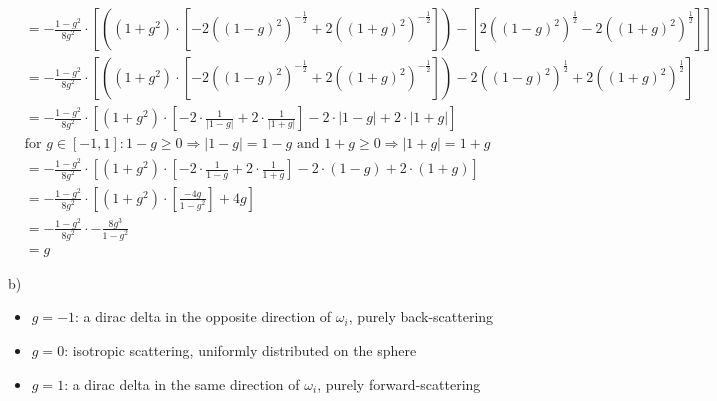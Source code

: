 \documentclass{article}
\begin{document}
{{\begin{align*}
        &= -\frac{1 - g^2}{8g^2} \cdot \left[\left( (1 + g^2) \cdot \left[-2((1-g)^2)^{-\frac{1}{2}} + 2((1+g)^2)^{-\frac{1}{2}}\right]\right) - \left[2((1-g)^2)^{\frac{1}{2}} - 2((1+g)^2)^{\frac{1}{2}}\right] \right]\\
        &= -\frac{1 - g^2}{8g^2} \cdot \left[\left( (1 + g^2) \cdot \left[-2((1-g)^2)^{-\frac{1}{2}} + 2((1+g)^2)^{-\frac{1}{2}}\right]\right) - 2((1-g)^2)^{\frac{1}{2}} + 2((1+g)^2)^{\frac{1}{2}} \right]\\
        &= -\frac{1 - g^2}{8g^2} \cdot \left[ (1 + g^2) \cdot \left[-2 \cdot \frac{1}{|1-g|} + 2 \cdot \frac{1}{|1+g|}\right] - 2 \cdot |1-g| + 2 \cdot |1+g|\right]\\
        &\text{for } g \in [-1,1]: 1-g \geq 0 \Rightarrow |1-g|=1-g \text{ and } 1+g \geq 0 \Rightarrow |1+g| = 1+g\\
        &= -\frac{1 - g^2}{8g^2} \cdot \left[ (1 + g^2) \cdot \left[-2 \cdot \frac{1}{1-g} + 2 \cdot \frac{1}{1+g}\right] - 2 \cdot (1-g) + 2 \cdot (1+g)\right]\\
        &= -\frac{1 - g^2}{8g^2} \cdot \left[ (1 + g^2) \cdot \left[\frac{-4g}{1-g^2}\right] + 4g\right]\\
        &= -\frac{1 - g^2}{8g^2} \cdot -\frac{8g^3}{1-g^2}\\
        &= g
    \end{align*}
    }}
        
    b) 
    \begin{itemize}
        \item $g=-1$: a dirac delta in the opposite direction of $\omega_i$, purely back-scattering
        \item $g=0$: isotropic scattering, uniformly distributed on the sphere 
        \item $g=1$: a dirac delta in the same direction of $\omega_i$, purely forward-scattering
    \end{itemize}
\end{document}
